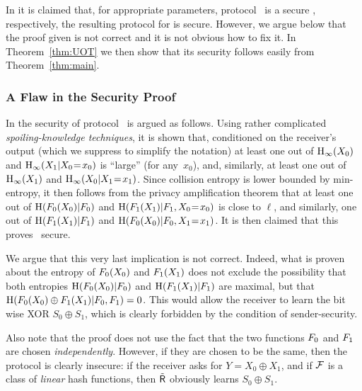 In \cite{Cachin98} it is claimed that, for appropriate parameters,
protocol \OTUOT\ is a secure \Rand\: \lStringOT, respectively, the
resulting protocol for \OT is secure. However, we argue below that
the proof given is not correct and it is not obvious how to fix it.
In Theorem~\ref{thm:UOT} we then show that its security follows easily
from Theorem~\ref{thm:main}.



\subsubsection{A Flaw in the Security Proof}

In \cite{Cachin98} the security of protocol \OTUOT\ is argued as
follows.  Using rather complicated {\em spoiling-knowledge
  techniques}, it is  shown that,
conditioned on the receiver's output (which we suppress to simplify
the notation) at least one out of $\operatorname{H}_{\infty}(X_0)$ and
$\operatorname{H}_{\infty}(X_1|X_0 \hspace{-0.5ex}=\hspace{-0.4ex} x_0)$ is ``large'' (for any~$x_0$), and,
similarly, at least one out of $\operatorname{H}_{\infty}(X_1)$ and
\mbox{$\operatorname{H}_{\infty}(X_0|X_1 \hspace{-0.5ex}=\hspace{-0.4ex} x_1)$}.  Since collision entropy is
lower bounded by min-entropy, it then follows from the privacy
amplification theorem that at least one out of $\operatorname{H}(F_0(X_0)|F_0)$
and $\operatorname{H}(F_1(X_1)|F_1, X_0 \hspace{-0.5ex}=\hspace{-0.4ex} x_0)$ is close to $\ell$, and
similarly,
one out of $\operatorname{H}(F_1(X_1)|F_1)$ and $\operatorname{H}(F_0(X_0)|F_0, X_1 \hspace{-0.5ex}=\hspace{-0.4ex}
x_1)$. It is then claimed that this proves \OTUOT\ secure.

We argue that this very last implication is not correct. Indeed, what
is proven about the entropy of $F_0(X_0)$ and $F_1(X_1)$ does not
exclude the possibility that both entropies $\operatorname{H}(F_0(X_0)|F_0)$ and
$\operatorname{H}(F_1(X_1)|F_1)$ are maximal, but that
$\operatorname{H}(F_0(X_0)\oplus F_1(X_1)|F_0,F_1) = 0$. This would allow the
receiver to learn the bit wise XOR $S_0 \oplus S_1$, which is clearly
forbidden by the condition of sender-security.

Also note that the proof does not use the fact that the two functions
$F_0$ and $F_1$ are chosen {\em independently}. However, if they
are chosen to be the same, then the protocol is clearly insecure: if
the receiver asks for $Y = X_0 \oplus X_1$, and if ${\cal F}$ is a class of
{\em linear} \univ hash functions, then $\tilde{\sf R}$ obviously learns $S_0
\oplus S_1$.


